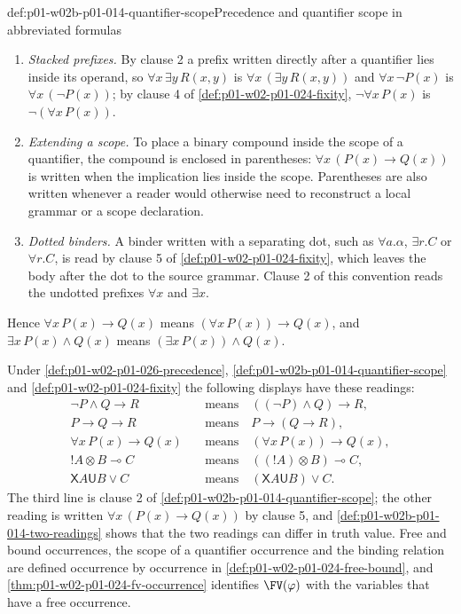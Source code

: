 \begin{hbconvention}{def:p01-w02b-p01-014-quantifier-scope}{Precedence and quantifier scope in abbreviated formulas}
\begin{enumerate}
\item \emph{Stacked prefixes.}  By clause 2 a prefix written directly
  after a quantifier lies inside its operand, so
  \(\forall x\,\exists y\,R(x,y)\) is \(\forall x\,(\exists y\,R(x,y))\)
  and \(\forall x\,\neg P(x)\) is \(\forall x\,(\neg P(x))\); by clause 4
  of \cref{def:p01-w02-p01-024-fixity}, \(\neg\forall x\,P(x)\) is
  \(\neg(\forall x\,P(x))\).
\item \emph{Extending a scope.}  To place a binary compound inside the
  scope of a quantifier, the compound is enclosed in parentheses:
  \(\forall x\,(P(x)\to Q(x))\) is written when the implication lies inside
  the scope.  Parentheses are also written whenever a reader would
  otherwise need to reconstruct a local grammar or a scope declaration.
\item \emph{Dotted binders.}  A binder written with a separating dot, such
  as \(\forall a.\alpha\), \(\exists r.C\) or \(\forall r.C\), is read by
  clause 5 of \cref{def:p01-w02-p01-024-fixity}, which leaves the body
  after the dot to the source grammar.  Clause 2 of this convention reads
  the undotted prefixes \(\forall x\) and \(\exists x\).
\end{enumerate}
Hence \(\forall x\,P(x)\to Q(x)\) means \((\forall x\,P(x))\to Q(x)\), and
\(\exists x\,P(x)\land Q(x)\) means \((\exists x\,P(x))\land Q(x)\).
\end{hbconvention}



Under \cref{def:p01-w02-p01-026-precedence},
\cref{def:p01-w02b-p01-014-quantifier-scope} and
\cref{def:p01-w02-p01-024-fixity} the following displays have these
readings:
\[
\begin{aligned}
 \neg P\land Q\to R
   &\quad\text{means}\quad ((\neg P)\land Q)\to R,\\
 P\to Q\to R
   &\quad\text{means}\quad P\to(Q\to R),\\
 \forall x\,P(x)\to Q(x)
   &\quad\text{means}\quad (\forall x\,P(x))\to Q(x),\\
 !A\otimes B\multimap C
   &\quad\text{means}\quad ((!A)\otimes B)\multimap C,\\
 \mathsf X A\mathbin{\mathsf U}B\lor C
   &\quad\text{means}\quad (\mathsf X A\mathbin{\mathsf U}B)\lor C.
\end{aligned}
\]
The third line is clause 2 of
\cref{def:p01-w02b-p01-014-quantifier-scope}; the other reading is written
\(\forall x\,(P(x)\to Q(x))\) by clause 5, and
\cref{def:p01-w02b-p01-014-two-readings} shows that the two readings can
differ in truth value.  Free and bound
occurrences, the scope of a quantifier occurrence and the binding relation
are defined occurrence by occurrence in \cref{def:p01-w02-p01-024-free-bound},
and \cref{thm:p01-w02-p01-024-fv-occurrence} identifies \(\FV(\varphi)\)
with the variables that have a free occurrence.

